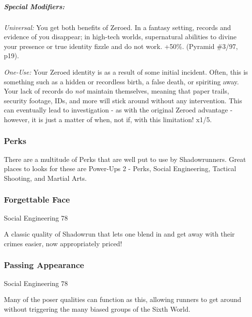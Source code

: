 \begin{multicols}{3}
	\subparagraph{Special Modifiers:\\}
	
	\textit{Universal:} You get both benefits of Zeroed. In a fantasy setting, records and evidence of you disappear; in high-tech worlds, supernatural abilities to divine your presence or true identity fizzle and do not work. +50\%. (\GURPS Pyramid \#3/97, p19). 
	
	\textit{One-Use:} Your Zeroed identity is as a result of some initial incident. Often, this is something such as a hidden or recordless birth, a false death, or spiriting away. Your lack of records do \textit{not} maintain themselves, meaning that paper trails, security footage, IDs, and more will stick around without any intervention. This can eventually lead to investigation - as with the original Zeroed advantage - however, it is just a matter of when, not if, with this limitation! x1/5.
	
	\subsubsection{Perks}
	
	There are a multitude of Perks that are well put to use by Shadowrunners. Great places to looks for these are Power-Ups 2 - Perks, Social Engineering, Tactical Shooting, and Martial Arts.
	
	\subsubsection*{Forgettable Face}\label{forgettable_face}
	\begin{flushright}
		Social Engineering 78
	\end{flushright}

	A classic quality of Shadowrun that lets one blend in and get away with their crimes easier, now appropriately priced!
	
	
	\subsubsection*{Passing Appearance}\label{passing_appearance}
	\begin{flushright}
		Social Engineering 78
	\end{flushright}

	Many of the poser qualities can function as this, allowing runners to get around without triggering the many biased groups of the Sixth World.
	
		

\end{multicols}
